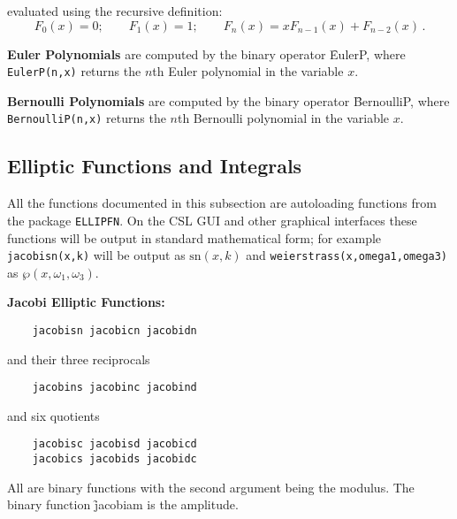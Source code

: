 evaluated using the recursive definition:
\[F_0(x) = 0;\qquad F_1(x) = 1; \qquad F_n(x) = x F_{n-1}(x) + F_{n-2}(x)\,.\]

\textbf{Euler Polynomials} are computed by the binary operator
\f{EulerP}, where\linebreak
\texttt{EulerP(n,x)} returns the $n$th Euler polynomial in the variable $x$.

\textbf{Bernoulli Polynomials} are computed by the binary operator
\f{BernoulliP}, where \texttt{BernoulliP(n,x)} returns the
$n$th Bernoulli polynomial in the variable $x$.

\subsection{Elliptic Functions and Integrals}
All the functions documented in this subsection are autoloading
functions from the package \texttt{ELLIPFN}.  On the CSL GUI and other graphical
interfaces these functions will be output in standard mathematical form;
for example \texttt{jacobisn(x,k)} will be output as $\mathrm{sn}(x,k)$ and
\texttt{weierstrass(x,omega1,omega3)} as $\wp(x,\omega_1,\omega_3)$.

\textbf{Jacobi Elliptic Functions:}
\begin{verbatim}
    jacobisn jacobicn jacobidn
\end{verbatim}
and their three reciprocals
\begin{verbatim}
    jacobins jacobinc jacobind
\end{verbatim}
and six quotients
\begin{verbatim}
    jacobisc jacobisd jacobicd
    jacobics jacobids jacobidc
\end{verbatim}
All are binary functions with the second argument being the modulus.
The binary function \f{jacobiam} is the amplitude.

